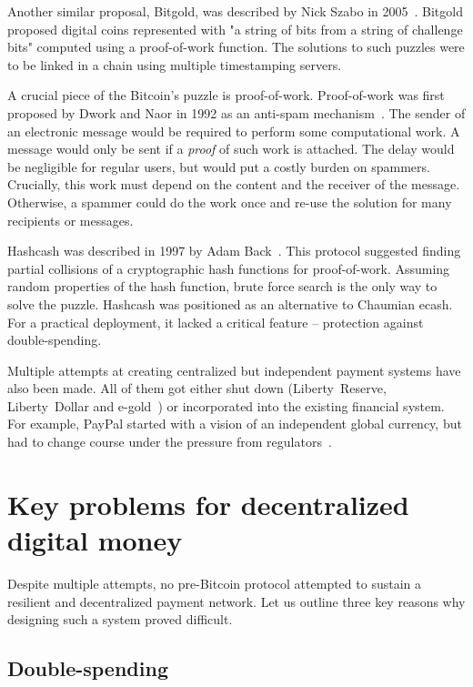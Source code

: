 Another similar proposal, Bitgold, was described by Nick Szabo in 2005~\cite{Szabo2005}.
Bitgold proposed digital coins represented with "a string of bits from a string of challenge bits" computed using a proof-of-work function.
The solutions to such puzzles were to be linked in a chain using multiple timestamping servers.

A crucial piece of the Bitcoin's puzzle is proof-of-work.
Proof-of-work was first proposed by Dwork and Naor in 1992 as an anti-spam mechanism~\cite{Dwork1992}.
The sender of an electronic message would be required to perform some computational work.
A message would only be sent if a \textit{proof} of such work is attached.
The delay would be negligible for regular users, but would put a costly burden on spammers.
Crucially, this work must depend on the content and the receiver of the message.
Otherwise, a spammer could do the work once and re-use the solution for many recipients or messages.

Hashcash was described in 1997 by Adam Back~\cite{Back1997}.
This protocol suggested finding partial collisions of a cryptographic hash functions for proof-of-work.
Assuming random properties of the hash function, brute force search is the only way to solve the puzzle.
Hashcash was positioned as an alternative to Chaumian ecash.
For a practical deployment, it lacked a critical feature -- protection against double-spending.

Multiple attempts at creating centralized but independent payment systems have also been made.
All of them got either shut down (Liberty~Reserve, Liberty~Dollar and e-gold~\cite{White2014, Trautman2014}) or incorporated into the existing financial system.
For example, PayPal started with a vision of an independent global currency, but had to change course under the pressure from regulators~\cite{Jackson2017}.


\section{Key problems for decentralized digital money}

Despite multiple attempts, no pre-Bitcoin protocol attempted to sustain a resilient and decentralized payment network.
Let us outline three key reasons why designing such a system proved difficult.

\subsection{Double-spending}

